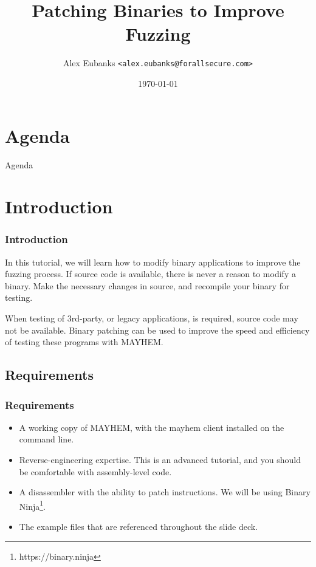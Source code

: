\documentclass{beamer}
\title{Patching Binaries to Improve Fuzzing}
\date{\today}
\author[Eubanks]{Alex Eubanks \texttt{<alex.eubanks@forallsecure.com>}}
\begin{document}
\begin{frame}
\titlepage
\end{frame}

\section{Agenda}

\begin{frame}{Agenda}
\setlength{\parskip}{0cm}
\tableofcontents
\end{frame}

\section{Introduction}

\begin{frame}
\frametitle{Introduction}
In this tutorial, we will learn how to modify binary applications to improve the
fuzzing process. If source code is available, there is never a reason to modify
a binary. Make the necessary changes in source, and recompile your binary for
testing.\par
When testing of 3rd-party, or legacy applications, is required, source code may
not be available. Binary patching can be used to improve the speed and
efficiency of testing these programs with MAYHEM.
\end{frame}

\subsection{Requirements}

\begin{frame}
\frametitle{Requirements}
\begin{itemize}
  \item A working copy of MAYHEM, with the mayhem client installed on the 
    command line.
  \item Reverse-engineering expertise. This is an advanced tutorial, and you
    should be comfortable with assembly-level code.
  \item A disassembler with the ability to patch instructions. We will be using
    Binary Ninja\footnote{https://binary.ninja}.
  \item The example files that are referenced throughout the slide deck.
\end{itemize}
\end{frame}
\end{document}
